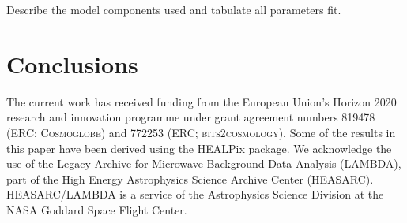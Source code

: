 \documentclass{aa}
\begin{document}
Describe the model components used and tabulate all parameters fit.



\section{Conclusions}


\begin{acknowledgements}
 The current work has received funding from the European
  Union’s Horizon 2020 research and innovation programme under grant
  agreement numbers 819478 (ERC; \textsc{Cosmoglobe}) and 772253 (ERC;
  \textsc{bits2cosmology}). Some of the results in this paper have been derived using the HEALPix \citep{HEALPIX} package.
  We acknowledge the use of the Legacy Archive for Microwave Background Data
  Analysis (LAMBDA), part of the High Energy Astrophysics Science Archive Center
  (HEASARC). HEASARC/LAMBDA is a service of the Astrophysics Science Division at
  the NASA Goddard Space Flight Center.  
\end{acknowledgements}


%



\end{document}
